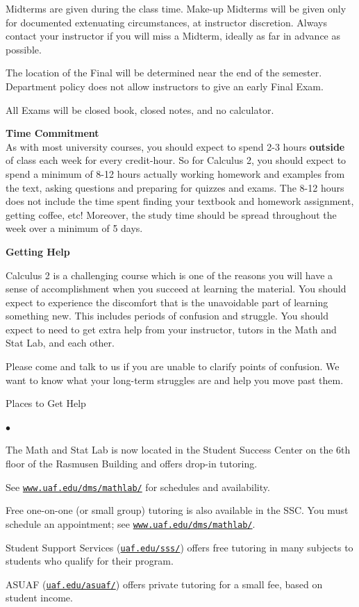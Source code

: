 \documentclass[12pt]{article}
\renewcommand{\emph}[1]{\textsf{\textbf{#1}}}
\newcommand{\localhead}[1]{\par\smallskip\textbf{#1} \smallskip\nobreak\\}%
\def\heading#1{\localhead{\large\emph{#1}}}
\newenvironment{clist}%
{\bgroup\parskip 0pt\begin{list}{$\bullet$}{\partopsep 4pt\topsep 0pt\itemsep -2pt}}%
{\end{list}\egroup}%
\begin{document}
Midterms are given during the class time. Make-up Midterms will be given only for documented extenuating circumstances, at instructor discretion. Always contact your instructor if you will miss a Midterm, ideally as far in advance as possible.

The location of the Final will be determined near the end of the semester. Department policy does not allow instructors to give an early Final Exam.

All Exams will be closed book, closed notes, and no calculator.

\heading{Time Commitment}

\vspace*{-.3in}
As with most university courses, you should expect to spend 2-3 hours \textbf{outside} of class each week for every credit-hour. So for Calculus 2, you should expect to spend a minimum of 8-12 hours actually working homework and examples from the text, asking questions and preparing for quizzes and exams. The 8-12 hours does not include the time spent finding your textbook and homework assignment, getting coffee, etc! Moreover, the study time should be spread throughout the week over a minimum of 5 days.

\heading{Getting Help}
\vspace*{-.3in}

Calculus 2 is a challenging course which is one of the reasons you will have a sense of accomplishment when you succeed at learning the material. You should expect to experience the discomfort that is the unavoidable part of learning something new. This includes periods of confusion and struggle. You should expect to need to get extra help from your instructor, tutors in the Math and Stat Lab, and each other. 

Please come and talk to us if you are unable to clarify points of confusion. We want to know what your long-term struggles are and help you move past them.

Places to Get Help

\vskip -20pt\strut
\begin{clist}
    \item The Math and Stat Lab is now located in the
      Student Success Center on the 6th floor of the Rasmusen Building and
      offers drop-in tutoring.

	See \href{http://www.uaf.edu/dms/mathlab/}{\texttt{www.uaf.edu/dms/mathlab/}} for schedules and availability.
	\item Free
one-on-one (or small group) tutoring is also available in 
the SSC. You must schedule an
appointment; see \href{http://www.uaf.edu/dms/mathlab/}{\texttt{www.uaf.edu/dms/mathlab/}}.
	\item Student Support Services (\href{https://uaf.edu/sss/}{\texttt{uaf.edu/sss/}}) offers free tutoring in many subjects to students who qualify for their program.
	\item ASUAF (\href{https://uaf.edu/asuaf/}{\texttt{uaf.edu/asuaf/}}) offers private tutoring for a small fee, based on student income.
\end{clist}
\end{document}
